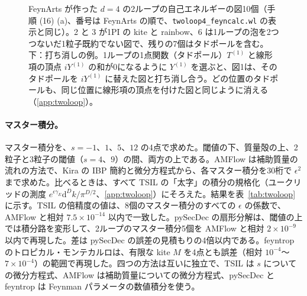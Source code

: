 \documentclass[a4paper,10pt]{ltjsarticle}
\newcommand{\dd}{\mathrm{d}}
\begin{document}
\begin{figure}[tbp]
\caption{FeynArts が作った $d=4$ の2ループの自己エネルギーの図10個（手順 (16) (a)、番号は FeynArts の順で、\texttt{twoloop4\_feyncalc.wl} の表示と同じ）。2 と 3 が1PI の kite と rainbow、6 は1ループの泡を2つつないだ1粒子既約でない図で、残りの7個はタドポールを含む。下：打ち消しの例。1ループの1点関数（タドポール）$T^{(1)}$ と線形項の頂点 $iY^{(1)}$ の和が0になるように $Y^{(1)}$ を選ぶと、図1は、そのタドポールを $iY^{(1)}$ に替えた図と打ち消し合う。どの位置のタドポールも、同じ位置に線形項の頂点を付けた図と同じように消える（\ref{app:twoloop}）。}
\label{fig:twoloopall}
\end{figure}

\paragraph{マスター積分。}マスター積分を、$s=-1$、$1$、$5$、$12$ の4点で求めた。閾値の下、質量殻の上、2粒子と3粒子の閾値（$s=4$、$9$）の間、両方の上である。AMFlow は補助質量の流れの方法で、Kira の IBP 簡約と微分方程式から、各マスター積分を30桁で $\epsilon^2$ まで求めた。比べるときは、すべて TSIL の「太字」の積分の規格化（ユークリッドの測度 $e^{\epsilon\gamma_E}\dd^Dk/\pi^{D/2}$、\ref{app:twoloop}）にそろえた。結果を表~\ref{tab:twoloop} に示す。TSIL の倍精度の値は、8個のマスター積分のすべての $\epsilon$ の係数で、AMFlow と相対 $7.5\times10^{-14}$ 以内で一致した。pySecDec の扇形分解は、閾値の上では積分路を変形して、2ループのマスター積分5個を AMFlow と相対 $2\times10^{-9}$ 以内で再現した。差は pySecDec の誤差の見積もりの4倍以内である。feyntrop のトロピカル・モンテカルロは、有限な kite $M$ を4点とも誤差（相対 $10^{-4}$〜$7\times10^{-4}$）の範囲で再現した。四つの方法は互いに独立で、TSIL は $s$ についての微分方程式、AMFlow は補助質量についての微分方程式、pySecDec と feyntrop は Feynman パラメータの数値積分を使う。
\end{document}
